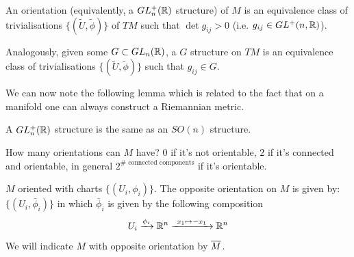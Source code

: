 \begin{defn}
    An orientation (equivalently, a $GL^+_n(\mathbb{R})$ structure) of $M$ is an equivalence class of trivialisations $\{(\tilde U, \tilde \phi)\}$ of $TM$ such that $\det g_{ij} > 0$ (i.e. $g_{ij} \in GL^+(n,\mathbb{R})$).

    \noindent Analogously, given some $G \subset GL_n(\mathbb{R})$, a $G$ structure on $TM$ is an equivalence class of trivialisations $\{(\tilde U, \tilde \phi)\}$ such that $g_{ij} \in G$.
\end{defn}

\noindent We can now note the following lemma which is related to the fact that on a manifold one can always construct a Riemannian metric.
\begin{lem}
    A $GL_n^+ (\mathbb{R})$ structure is the same as an $SO(n)$ structure.
\end{lem}

\noindent How many orientations can $M$ have? $0$ if it's not orientable, $2$ if it's connected and orientable, in general $2^{\# \text{ connected components}}$ if it's orientable.

\begin{defn}
    $M$ oriented with charts $\{(U_i, \phi_i)\}$. The opposite orientation on $M$ is given by: $\{(U_i, \bar \phi_i)\}$ in which $\bar \phi_i$ is given by the following composition
    \begin{equation}
        U_i \xrightarrow{\phi_i} \R^n \xrightarrow{ \ x_1\mapsto-x_1 \ } \R^n %
    \end{equation}
    We will indicate $M$ with opposite orientation by $\overline{M}$.
\end{defn}

